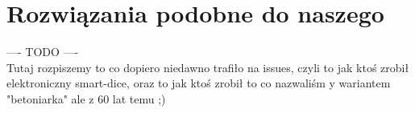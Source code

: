 \section{Rozwiązania podobne do naszego}\label{sec:rozwiazania-podobne-do-naszego}

---- TODO ---- \\

Tutaj rozpiszemy to co dopiero niedawno trafiło na issues, czyli to jak ktoś zrobił elektroniczny smart-dice,
oraz to jak ktoś zrobił to co nazwaliśm y wariantem "betoniarka" ale z 60 lat temu ;)